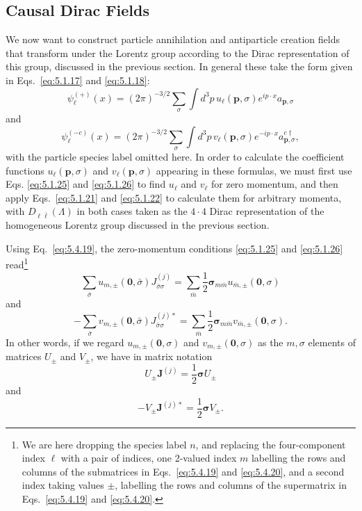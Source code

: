 
\subsection{Causal Dirac Fields}

We now want to construct particle annihilation and antiparticle creation fields
that transform under the Lorentz group according to the Dirac representation
of this group, discussed in the previous section. In general these take the
form given in Eqs.~\eqref{eq:5.1.17} and \eqref{eq:5.1.18}:
\begin{equation}
\psi_\ell^{(+)}(x)=(2\pi)^{-3/2}\sum_\sigma\int d^3p\,
u_\ell(\mathbf p,\sigma)e^{ip\cdot x}a_{\mathbf p,\sigma}
\tag{5.5.1}\label{eq:5.5.1}
\end{equation}
and
\begin{equation}
\psi_\ell^{(-c)}(x)=(2\pi)^{-3/2}\sum_\sigma\int d^3p\,
v_\ell(\mathbf p,\sigma)e^{-ip\cdot x}a^{c\dagger}_{\mathbf p,\sigma},
\tag{5.5.2}\label{eq:5.5.2}
\end{equation}
with the particle species label omitted here. In order to calculate the
coefficient functions $u_\ell(\mathbf p,\sigma)$ and
$v_\ell(\mathbf p,\sigma)$ appearing in these formulas, we must first use Eqs.
\eqref{eq:5.1.25} and \eqref{eq:5.1.26} to find $u_\ell$ and $v_\ell$ for zero momentum, and then
apply Eqs.~\eqref{eq:5.1.21} and \eqref{eq:5.1.22} to calculate them for arbitrary momenta, with
$D_{\ell\bar\ell}(\Lambda)$ in both cases taken as the $4\cdot4$ Dirac
representation of the homogeneous Lorentz group discussed in the previous
section.

Using Eq.~\eqref{eq:5.4.19}, the zero-momentum conditions \eqref{eq:5.1.25} and \eqref{eq:5.1.26}
read\footnote{We are here dropping the species label $n$, and replacing the
four-component index $\ell$ with a pair of indices, one 2-valued index $m$
labelling the rows and columns of the submatrices in Eqs.~\eqref{eq:5.4.19} and
\eqref{eq:5.4.20}, and a second index taking values $\mathord\pm$, labelling the rows
and columns of the supermatrix in Eqs.~\eqref{eq:5.4.19} and \eqref{eq:5.4.20}.}
\[
\sum_{\bar\sigma}u_{m,\pm}(\mathbf0,\bar\sigma)
J^{(j)}_{\bar\sigma\sigma}
=\sum_{\bar m}\frac12\boldsymbol{\sigma}_{m\bar m}
u_{\bar m,\pm}(\mathbf0,\sigma)
\]
and
\[
-\sum_{\bar\sigma}v_{m,\pm}(\mathbf0,\bar\sigma)
J^{(j)*}_{\bar\sigma\sigma}
=\sum_{\bar m}\frac12\boldsymbol{\sigma}_{m\bar m}
v_{\bar m,\pm}(\mathbf0,\sigma).
\]
In other words, if we regard $u_{m,\pm}(\mathbf0,\sigma)$ and
$v_{m,\pm}(\mathbf0,\sigma)$ as the $m,\sigma$ elements of matrices $U_\pm$
and $V_\pm$, we have in matrix notation
\begin{equation}
U_\pm\mathbf J^{(j)}=\frac12\boldsymbol{\sigma}U_\pm
\tag{5.5.3}\label{eq:5.5.3}
\end{equation}
and
\begin{equation}
-V_\pm\mathbf J^{(j)*}=\frac12\boldsymbol{\sigma}V_\pm.
\tag{5.5.4}\label{eq:5.5.4}
\end{equation}

